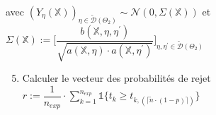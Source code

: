 \documentclass{article}
\begin{document}
\begin{algorithm}[h!]
\begin{flushright}
                        avec $(Y_\eta(\mathbb{X}))_{\eta\in\tilde{\mathcal{D}}(\Theta_2)}\sim\mathcal{N}(0,\Sigma(\mathbb{X}))$ et $\Sigma(\mathbb{X}):=\Big[\dfrac{b(\mathbb{X,\eta,\eta^\prime})}{\sqrt{a(\mathbb{X},\eta)\cdot{}a(\mathbb{X},\eta^\prime)}}\Big]_{\eta,\eta^\prime\in\tilde{\mathcal{D}}(\Theta_2)}$
                    \end{flushright}
                    \begin{enumerate}
                    \setcounter{enumi}{4}
                        \item Calculer le vecteur des probabilités de rejet $r:=\dfrac{1}{n_{exp}}\cdot\sum_{k=1}^{n_{exp}}\mathbb{1}\{t_k\geq t_{k,(\lceil \tilde{n}\cdot (1-p) \rceil)}\}$
                    \end{enumerate}
                \end{algorithm}

    

\clearpage
\pagebreak
\end{document}
